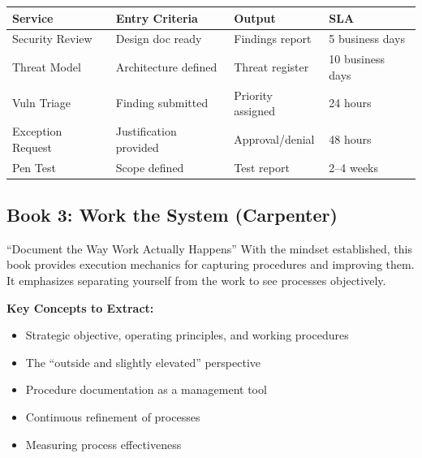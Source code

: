 \documentclass[11pt,letterpaper]{article}
\begin{document}
\begin{center}
\renewcommand{\arraystretch}{1.3}
\begin{tabular}{p{3.5cm}p{3cm}p{3cm}p{3cm}}
\toprule
\textbf{Service} & \textbf{Entry Criteria} & \textbf{Output} & \textbf{SLA} \\
\midrule
Security Review & Design doc ready & Findings report & 5 business days \\
Threat Model & Architecture defined & Threat register & 10 business days \\
Vuln Triage & Finding submitted & Priority assigned & 24 hours \\
Exception Request & Justification provided & Approval/denial & 48 hours \\
Pen Test & Scope defined & Test report & 2--4 weeks \\
\bottomrule
\end{tabular}
\end{center}

\newpage

\subsection{Book 3: Work the System (Carpenter)}

\begin{bookbox}{``Document the Way Work Actually Happens''}
With the mindset established, this book provides execution mechanics for capturing procedures and improving them. It emphasizes separating yourself from the work to see processes objectively.

\vspace{0.5cm}

\textbf{Key Concepts to Extract:}
\begin{itemize}[nosep]
    \item Strategic objective, operating principles, and working procedures
    \item The ``outside and slightly elevated'' perspective
    \item Procedure documentation as a management tool
    \item Continuous refinement of processes
    \item Measuring process effectiveness
\end{itemize}
\end{bookbox}
\end{document}

